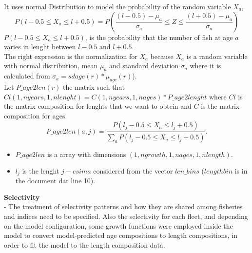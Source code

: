 \documentclass{article}
\begin{document}
It uses normal Distribution to model the probability of the random variable $X_a$, 
\begin{equation}
    P(l-0.5\leq X_a\leq l+0.5 ) = P\left(\dfrac{(l-0.5)-\mu_a}{\sigma_a}\leq Z\leq\dfrac{(l+0.5)-\mu_a}{\sigma_a}\right)
\end{equation}
$P(l-0.5\leq X_a\leq l+0.5 )$, is the probability that the number of fish at age $a$ varies in lenght between  $l-0.5$ and $l+0.5$. \\
The right expression is the normalization for $X_a$ because $X_a$ is a random variable with normal distribution, mean $\mu_a$ and  standard deviation $\sigma_a$ where it is calculated from $\sigma_{a}=sdage(r)*\mu_{age}(r)$).\\
Let $P\_age2len(r)$ the matrix such that $Cl(1,nyears,1,nlenght)=C(1,nyears,1,nages)*P\_age2lenght$ where $Cl$ is the matrix composition for lenghts that we want to obtein and $C$ is the matrix composition for ages.
\begin{equation}
    P\_age2len(a,j) = \dfrac{P(l_j-0.5\leq X_a\leq l_j+0.5 )}{\sum_{a}P(l_j-0.5\leq X_a\leq l_j+0.5 )}.
\end{equation}

\begin{itemize}
    \item $P\_age2len$ is a array with dimensions  $(1,ngrowth,1,nages,1,nlength)$.
\end{itemize}
\begin{itemize}
    \item $l_j$ is the lenght $j-esima$ considered from the vector $len\_bins$ ($lengthbin$ is in the document dat line 10).
\end{itemize}

\textbf{Selectivity}\\

- The treatment of selectivity patterns and how they are shared among fisheries and indices need to be specified. Also the selectivity for each fleet, and depending on the model configuration, some growth functions were employed inside the model to convert model-predicted age compositions to length compositions, in order to fit the model to the length composition data.\\
\end{document}
